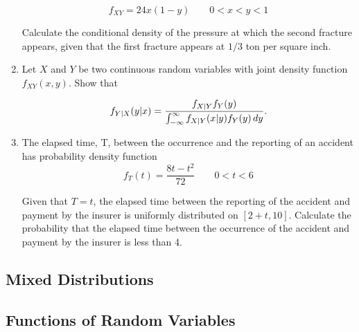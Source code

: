 \documentclass[../main.tex]{subfiles}
\begin{document}
\begin{exercises}
\begin{enumerate}
$$f_{XY}=24x(1-y) \qquad 0<x<y<1$$

Calculate the conditional density of the pressure at which the second fracture
appears, given that the first fracture appears at $1/3$ ton per square inch.


\item %
Let $X$ and $Y$ be two continuous random variables with joint density function
$f_{XY}(x,y)$. Show that

$$f_{Y|X}(y|x) = \dfrac{f_{X|Y}f_Y(y)}{\int_{-\infty}^{\infty}f_{X|Y}(x|y)f_Y(y)\,dy}.$$

\item %
The elapsed time, T, between the occurrence and the reporting of an accident
has probability density function
$$f_T(t) = \dfrac{8t-t^2}{72} \qquad 0<t<6$$

Given that $T = t$, the elapsed time between the reporting of the accident
and payment by the insurer is uniformly distributed on $[2 + t, 10]$.
Calculate the probability that the elapsed time between the occurrence of
the accident and payment by the insurer is less than 4.
\end{enumerate}
\end{exercises}

\subsection{Mixed Distributions}
\subsection{Functions of Random Variables}
\end{document}
